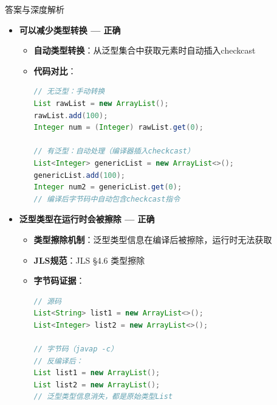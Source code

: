 \documentclass[12pt, a4paper]{ctexart}
\begin{document}
\begin{enumerate}[label=\textbf{\arabic*.}]
\begin{bluebox}{答案与深度解析}
\begin{itemize}[leftmargin=*, nosep, label={}]
\begin{itemize}[label={}, leftmargin=*, nosep]
\begin{lstlisting}[language=Java]
// 使用泛型（安全）
List<String> list2 = new ArrayList<>();
list2.add("Hello");
String s2 = list2.get(0);  // 无需转换
// list2.add(100);  // 编译错误！类型不安全
				      \end{lstlisting}
				            \item \textbf{字节码层面}：编译器插入checkcast指令确保类型安全
			            \end{itemize}

			      \item[B] \textbf{可以减少类型转换 — 正确}
			            \begin{itemize}[label={}, leftmargin=*, nosep]
				            \item \textbf{自动类型转换}：从泛型集合中获取元素时自动插入checkcast
				            \item \textbf{代码对比}：
				                  \begin{lstlisting}[language=Java]
// 无泛型：手动转换
List rawList = new ArrayList();
rawList.add(100);
Integer num = (Integer) rawList.get(0);

// 有泛型：自动处理（编译器插入checkcast）
List<Integer> genericList = new ArrayList<>();
genericList.add(100);
Integer num2 = genericList.get(0);
// 编译后字节码中自动包含checkcast指令
				      \end{lstlisting}
			            \end{itemize}

			      \item[C] \textbf{泛型类型在运行时会被擦除 — 正确}
			            \begin{itemize}[label={}, leftmargin=*, nosep]
				            \item \textbf{类型擦除机制}：泛型类型信息在编译后被擦除，运行时无法获取
				            \item \textbf{JLS规范}：JLS §4.6 类型擦除
				            \item \textbf{字节码证据}：
				                  \begin{lstlisting}[language=Java]
// 源码
List<String> list1 = new ArrayList<>();
List<Integer> list2 = new ArrayList<>();

// 字节码（javap -c）
// 反编译后：
List list1 = new ArrayList();
List list2 = new ArrayList();
// 泛型类型信息消失，都是原始类型List


\end{lstlisting}
\end{itemize}
\end{itemize}
\end{bluebox}
\end{enumerate}
\end{document}
